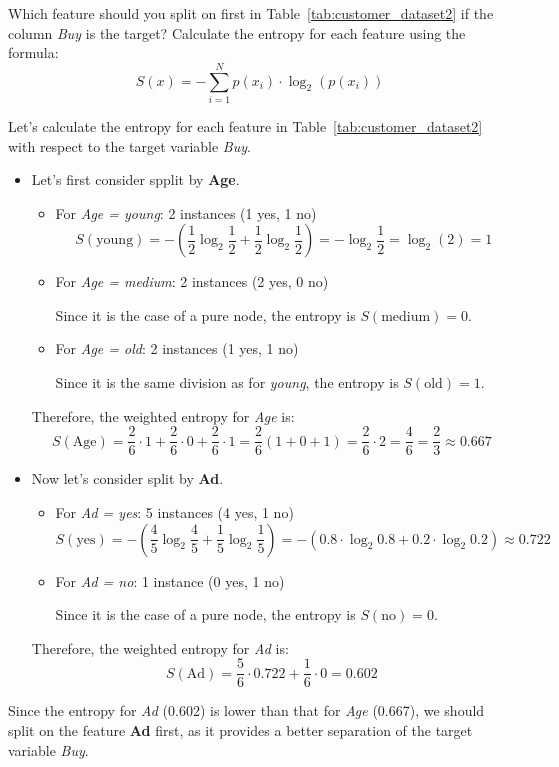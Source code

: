 \documentclass[12pt]{article}
\begin{document}
    \begin{ejercicio}
        Which feature should you split on first in Table~\ref{tab:customer_dataset2} if the column \textit{Buy} is the target? Calculate the entropy for each feature using the formula:
        \[ S(x) = -\sum_{i=1}^{N} p(x_i) \cdot \log_2(p(x_i)) \]

        Let's calculate the entropy for each feature in Table~\ref{tab:customer_dataset2} with respect to the target variable \textit{Buy}.
        \begin{itemize}
            \item Let's first consider spplit by \textbf{Age}.
            \begin{itemize}
                \item For \textit{Age = young}: 2 instances (1 yes, 1 no)
                \[ S(\text{young}) = -\left(\frac{1}{2} \log_2 \frac{1}{2} + \frac{1}{2} \log_2 \frac{1}{2}\right) = -\log_2 \frac{1}{2} = \log_2(2) = 1 \]
                \item For \textit{Age = medium}: 2 instances (2 yes, 0 no)
                
                Since it is the case of a pure node, the entropy is $S(\text{medium}) = 0$.
                \item For \textit{Age = old}: 2 instances (1 yes, 1 no)
                
                Since it is the same division as for \textit{young}, the entropy is $S(\text{old}) = 1$.
            \end{itemize}

            Therefore, the weighted entropy for \textit{Age} is:
            \[ S(\text{Age}) = \frac{2}{6} \cdot 1 + \frac{2}{6} \cdot 0 + \frac{2}{6} \cdot 1 = \frac{2}{6}\left(1 + 0 + 1\right) = \frac{2}{6} \cdot 2 = \frac{4}{6} = \frac{2}{3} \approx 0.667 \]

            \item Now let's consider split by \textbf{Ad}.
            \begin{itemize}
                \item For \textit{Ad = yes}: 5 instances (4 yes, 1 no)
                \[ S(\text{yes}) = -\left(\frac{4}{5} \log_2 \frac{4}{5} + \frac{1}{5} \log_2 \frac{1}{5}\right) = -\left(0.8 \cdot \log_2 0.8 + 0.2 \cdot \log_2 0.2\right) \approx 0.722 \]
                \item For \textit{Ad = no}: 1 instance (0 yes, 1 no)
                
                Since it is the case of a pure node, the entropy is $S(\text{no}) = 0$.
            \end{itemize}

            Therefore, the weighted entropy for \textit{Ad} is:
            \[ S(\text{Ad}) = \frac{5}{6} \cdot 0.722 + \frac{1}{6} \cdot 0 = 0.602 \]
        \end{itemize}

        Since the entropy for \textit{Ad} (0.602) is lower than that for \textit{Age} (0.667), we should split on the feature \textbf{Ad} first, as it provides a better separation of the target variable \textit{Buy}.
    \end{ejercicio}
\end{document}
